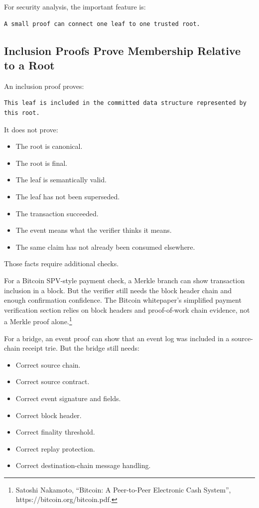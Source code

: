 For security analysis, the important feature is:

\begin{lstlisting}
A small proof can connect one leaf to one trusted root.
\end{lstlisting}

\subsection{Inclusion Proofs Prove Membership Relative to a Root}

An inclusion proof proves:

\begin{lstlisting}
This leaf is included in the committed data structure represented by this root.
\end{lstlisting}

It does not prove:

\begin{itemize}
\tightlist
\item
  The root is canonical.
\item
  The root is final.
\item
  The leaf is semantically valid.
\item
  The leaf has not been superseded.
\item
  The transaction succeeded.
\item
  The event means what the verifier thinks it means.
\item
  The same claim has not already been consumed elsewhere.
\end{itemize}

Those facts require additional checks.

For a Bitcoin SPV-style payment check, a Merkle branch can show
transaction inclusion in a block. But the verifier still needs the block
header chain and enough confirmation confidence. The Bitcoin
whitepaper's simplified payment verification section relies on block
headers and proof-of-work chain evidence, not a Merkle proof
alone.\footnote{Satoshi Nakamoto, ``Bitcoin: A Peer-to-Peer Electronic
  Cash System'', https://bitcoin.org/bitcoin.pdf.}

For a bridge, an event proof can show that an event log was included in
a source-chain receipt trie. But the bridge still needs:

\begin{itemize}
\tightlist
\item
  Correct source chain.
\item
  Correct source contract.
\item
  Correct event signature and fields.
\item
  Correct block header.
\item
  Correct finality threshold.
\item
  Correct replay protection.
\item
  Correct destination-chain message handling.
\end{itemize}

